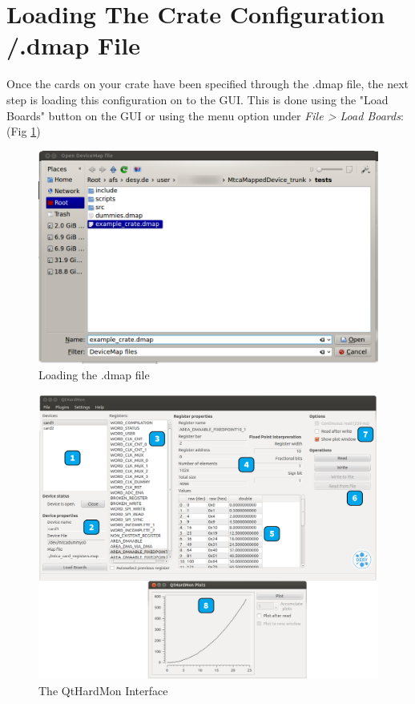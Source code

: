\section{Loading The Crate Configuration /.dmap File} 

Once the cards on your
crate have been specified through the .dmap file, the next step is loading this
configuration on to the GUI. This is done using the "Load Boards" button on the
GUI or using the menu option under \textit{File > Load Boards}: 
(Fig \ref{load_boards_open_menu_to_load_dmap})
 
\begin{figure}[htbp] 
    \centering
    \includegraphics[width=1\textwidth]{images/load_boards.png}
    \caption{Loading the .dmap file} \label{load_boards_open_menu_to_load_dmap}
\end{figure}

\begin{figure}[htbp] 
    \centering
    \includegraphics[width=1\textwidth]{images/GUI_interface.png} \caption{The
    QtHardMon Interface} \label{qthardmon_interface} \end{figure}

